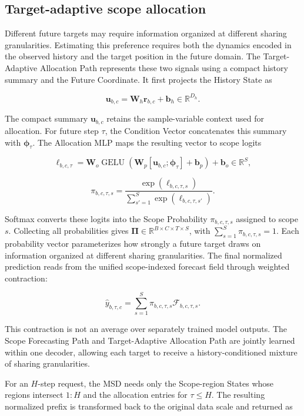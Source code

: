\documentclass[final,3p,times]{elsarticle}
\newif\ifshowrevisions
\newcommand{\rev}[1]{\ifshowrevisions\textcolor{revisionblue}{#1}\else#1\fi}
\begin{document}
\subsection{Target-adaptive scope allocation}


Different future targets may require information organized at different sharing granularities. Estimating this preference requires both the dynamics encoded in the observed history and the target position in the future domain. The Target-Adaptive Allocation Path represents these two signals using a compact history summary and the Future Coordinate. It first projects the History State as

\[
\mathbf u_{b,c}
=
\mathbf W_h\mathbf r_{b,c}
+
\mathbf b_h
\in\mathbb R^{D_h}.
\]


The compact summary $\mathbf u_{b,c}$ retains the sample-variable context used for allocation. For future step $\tau$, the Condition Vector concatenates this summary with $\boldsymbol\phi_\tau$. The Allocation MLP maps the resulting vector to scope logits

\[
\boldsymbol\ell_{b,c,\tau}
=
\mathbf W_o
\operatorname{GELU}\!\left(
\mathbf W_p
[\mathbf u_{b,c};\boldsymbol\phi_\tau]
+
\mathbf b_p
\right)
+
\mathbf b_o
\in\mathbb R^S,
\]


\[
\pi_{b,c,\tau,s}
=
\frac{
\exp(\ell_{b,c,\tau,s})
}{
\sum_{s'=1}^{S}
\exp(\ell_{b,c,\tau,s'})
}.
\]


Softmax converts these logits into the Scope Probability $\pi_{b,c,\tau,s}$ assigned to scope $s$. Collecting all probabilities gives $\boldsymbol\Pi\in\mathbb R^{B\times C\times T\times S}$, with $\sum_{s=1}^{S}\pi_{b,c,\tau,s}=1$. Each probability vector parameterizes how strongly a future target draws on information organized at different sharing granularities. The final normalized prediction reads from the unified scope-indexed forecast field through weighted contraction:

\[
\widehat y_{b,\tau,c}
=
\sum_{s=1}^{S}
\pi_{b,c,\tau,s}
\mathcal F_{b,c,\tau,s}.
\]


This contraction is not an average over separately trained model outputs. The Scope Forecasting Path and Target-Adaptive Allocation Path are jointly learned within one decoder, allowing each target to receive a history-conditioned mixture of sharing granularities.

For an $H$-step request, \rev{the MSD} needs only the Scope-region States whose regions intersect $1{:}H$ and the allocation entries for $\tau\leq H$. The resulting normalized prefix is transformed back to the original data scale and returned as
\end{document}
